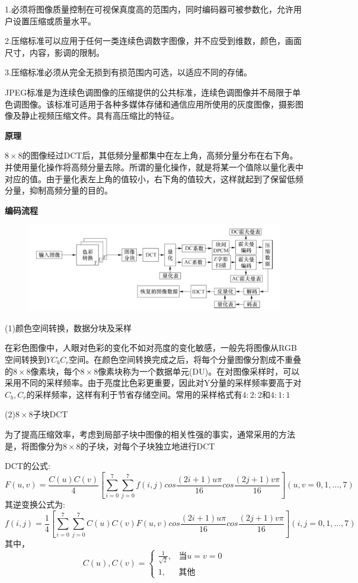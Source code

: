 \documentclass[11pt]{article}
\begin{document}
1.必须将图像质量控制在可视保真度高的范围内，同时编码器可被参数化，允许用户设置压缩或质量水平。

2.压缩标准可以应用于任何一类连续色调数字图像，并不应受到维数，颜色，画面尺寸，内容，影调的限制。

3.压缩标准必须从完全无损到有损范围内可选，以适应不同的存储。

JPEG标准是为连续色调图像的压缩提供的公共标准，连续色调图像并不局限于单色调图像。该标准可适用于各种多媒体存储和通信应用所使用的灰度图像，摄影图像及静止视频压缩文件。具有高压缩比的特征。

\textbf{原理}

$8\times 8$的图像经过DCT后，其低频分量都集中在左上角，高频分量分布在右下角。并使用量化操作将高频分量去除。所谓的量化操作，就是将某一个值除以量化表中对应的值。由于量化表左上角的值较小，右下角的值较大，这样就起到了保留低频分量，抑制高频分量的目的。

\textbf{编码流程}

\begin{figure}[H]
	\centering
	\includegraphics[scale=0.6]{46}
\end{figure}

(1)颜色空间转换，数据分块及采样

在彩色图像中，人眼对色彩的变化不如对亮度的变化敏感，一般先将图像从RGB空间转换到$YC_bC_r$空间。在颜色空间转换完成之后，将每个分量图像分割成不重叠的$8\times 8$像素块，每个$8\times 8$像素块称为一个数据单元(DU)。在对图像采样时，可以采用不同的采样频率。由于亮度比色彩更重要，因此对Y分量的采样频率要高于对$C_b,C_r$的采样频率，这样有利于节省存储空间。常用的采样格式有$4:2:2$和$4:1:1$

(2)$8\times 8$子块DCT

为了提高压缩效率，考虑到局部子块中图像的相关性强的事实，通常采用的方法是，将图像分为$8\times 8$的子块，对每个子块独立地进行DCT

DCT的公式:
$$F(u,v) = \frac{C(u)C(v)}{4}[\sum_{i=0}^{7}\sum_{j=0}^{7}f(i,j)cos\frac{(2i+1)u\pi}{16}cos\frac{(2j+1)v\pi}{16}](u,v=0,1,...,7)$$
其逆变换公式为:
$$f(i,j) = \frac{1}{4}[\sum_{i=0}^{7}\sum_{j=0}^{7}C(u)C(v)F(u,v)cos\frac{(2i+1)u\pi}{16}cos\frac{(2j+1)v\pi}{16}](i,j=0,1,...,7)$$
其中，
$$C(u),C(v) = \left\{\begin{matrix}
	\frac{1}{\sqrt{2}}, &\text{当}u=v=0 \\ 
	1, &\text{其他}
\end{matrix}\right.$$
\end{document}
